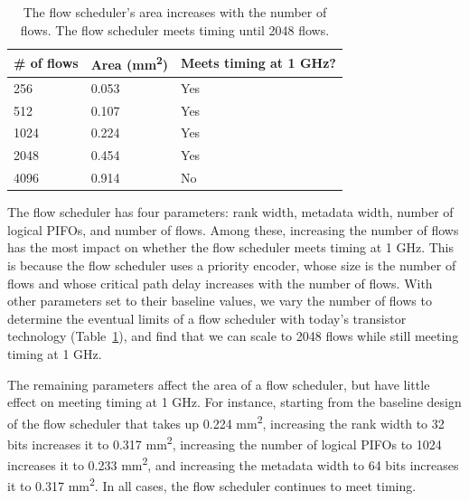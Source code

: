 \begin{table}
\centering
\begin{small}
\begin{tabular}{|p{}|p{}|p{}|}
\hline
\# of flows & Area (mm\textsuperscript{2}) & Meets timing at 1 GHz? \\
\hline
256 & 0.053 & Yes \\
\hline
512 & 0.107 & Yes \\
\hline
1024 & 0.224 & Yes \\
\hline
2048 & 0.454 & Yes \\
\hline
4096 & 0.914 & No \\
\hline
\end{tabular}
\end{small}
\caption{The flow scheduler's area increases with the number of
flows. The flow scheduler meets timing until 2048 flows.}
\label{tab:num_flows}
\end{table}

The flow scheduler has four parameters: rank width, metadata width, number of
logical PIFOs, and number of flows. Among these, increasing the number of flows
has the most impact on whether the flow scheduler meets timing at 1 GHz.  This
is because the flow scheduler uses a priority encoder, whose size is
the number of flows and whose critical path delay increases with the number of
flows. With other parameters set to their baseline values, we vary the number
of flows to determine the eventual limits of a flow scheduler with today's
transistor technology (Table~\ref{tab:num_flows}), and find that we can scale
to 2048 flows while still meeting timing at 1 GHz.

The remaining parameters affect the area of a flow scheduler, but have
little effect on meeting timing at 1 GHz. For instance, starting from
the baseline design of the flow scheduler that takes up 0.224
\si{\milli\metre\squared}, increasing the rank width to 32 bits increases it
 to 0.317 \si{\milli\metre\squared}, increasing the number of logical
PIFOs to 1024 increases it to 0.233 \si{\milli\metre\squared}, and
increasing the metadata width to 64 bits increases it to 0.317
\si{\milli\metre\squared}. In all cases, the flow scheduler continues to meet timing.


